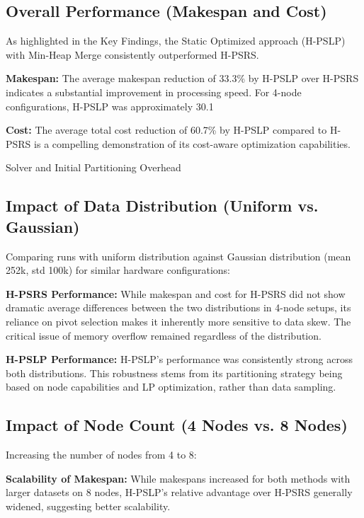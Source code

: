 \documentclass[]{interact}
\theoremstyle{plain}
\theoremstyle{definition}
\theoremstyle{remark}
\begin{document}
\subsection{Overall Performance (Makespan and Cost)}

As highlighted in the Key Findings, the Static Optimized approach (H-PSLP) with Min-Heap Merge consistently outperformed H-PSRS.

\textbf{Makespan:} The average makespan reduction of 33.3\% by H-PSLP over H-PSRS indicates a substantial improvement in processing speed. For 4-node configurations, H-PSLP was approximately 30.1%

\textbf{Cost:} The average total cost reduction of 60.7\% by H-PSLP compared to H-PSRS is a compelling demonstration of its cost-aware optimization capabilities.

Solver and Initial Partitioning Overhead\subsection{Impact of Data Distribution (Uniform vs. Gaussian)}

Comparing runs with uniform distribution against Gaussian distribution (mean 252k, std 100k) for similar hardware configurations:

\textbf{H-PSRS Performance:} While makespan and cost for H-PSRS did not show dramatic average differences between the two distributions in 4-node setups, its reliance on pivot selection makes it inherently more sensitive to data skew. The critical issue of memory overflow remained regardless of the distribution.

\textbf{H-PSLP Performance:} H-PSLP's performance was consistently strong across both distributions. This robustness stems from its partitioning strategy being based on node capabilities and LP optimization, rather than data sampling.

\subsection{Impact of Node Count (4 Nodes vs. 8 Nodes)}

Increasing the number of nodes from 4 to 8:

\textbf{Scalability of Makespan:} While makespans increased for both methods with larger datasets on 8 nodes, H-PSLP's relative advantage over H-PSRS generally widened, suggesting better scalability.
\end{document}
